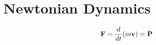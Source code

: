 \section{Newtonian Dynamics}
	\begin{equation}
		\mathbf{F} = \frac{d}{d t} (m \mathbf{v}) = \dot{\mathbf{P}}
		\label{Newton's Force equation}
	\end{equation}
